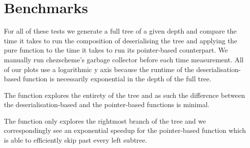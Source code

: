 


\section{Benchmarks}

For all of these tests we generate a full tree of a given depth and compare
the time it takes to run the composition of deserialising the tree and applying the pure function
to the time it takes to run its pointer-based counterpart.
%
We manually run chezscheme's garbage collector before each time measurement.
%
All of our plots use a logarithmic y axis because the runtime of the
deserialisation-based function is necessarily exponential in the depth
of the full tree.



The  function explores the entirety of the tree and as such the difference
between the deserialisation-based and the pointer-based functions is minimal.



The  function only explores the rightmost branch of
the tree and we correspondingly see an exponential speedup for the pointer-based
function which is able to efficiently skip past every left subtree.



